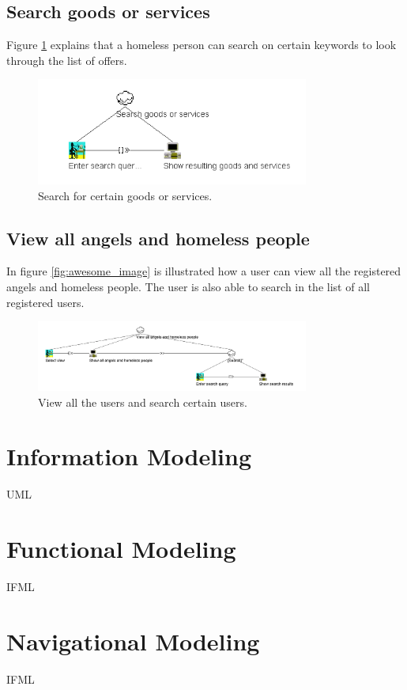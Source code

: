 \documentclass[a4paper]{report}
\begin{document}
\subsection{Search goods or services}
Figure \ref{fig:CTTSearchGoods} explains that a homeless person can search on certain keywords to look through the list of offers.
\begin{figure}[h]
    \centering
    \includegraphics[width=0.8\textwidth]{CTT/CTTpng/CTTSearchGoods.png}
    \caption{Search for certain goods or services.}
    \label{fig:CTTSearchGoods}
\end{figure}

\subsection{View all angels and homeless people}
In figure \ref{fig:awesome_image} is illustrated how a user can view all the registered angels and homeless people. The user is also able to search in the list of all registered users.
\begin{figure}[h]
    \centering
    \includegraphics[width=0.8\textwidth]{CTT/CTTpng/CTTViewAngels.png}
    \caption{View all the users and search certain users.}
    \label{fig:CTTViewAngels}
\end{figure}


\section{Information Modeling}
UML

\section{Functional Modeling}
IFML

\section{Navigational Modeling}
IFML
\end{document}
